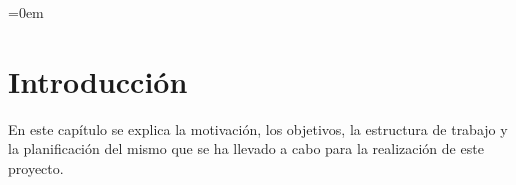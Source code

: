 \parindent=0em
\chapter{Introducción}
\noindent
En este capítulo se explica la motivación, los objetivos, la estructura de trabajo y la planificación del mismo que se ha llevado a cabo para la realización de este proyecto.





